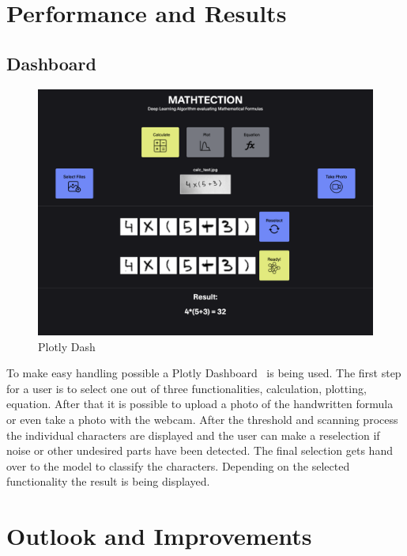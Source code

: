\documentclass[@CLASSOPTIONS@]{tumarticle}
\begin{document}
\section{Performance and Results}
\label{sec:customization}

\subsection{Dashboard}

\begin{figure}
    \begin{minipage}{0.48\textwidth}
     \centering
     \includegraphics[width=.9\linewidth]{figures/dash}
     \caption{Plotly Dash}\label{Fig:Dash}
   \end{minipage}
\end{figure}

To make easy handling possible a Plotly Dashboard~\cite{plotly} is being used.
The first step for a user is to select one out of three functionalities,
calculation, plotting, equation.
After that it is possible to upload a photo of the handwritten formula or even take a photo
with the webcam.
After the threshold and scanning process the individual characters are displayed
and the user can make a reselection if noise or other undesired parts have been detected.
The final selection gets hand over to the model to classify the characters.
Depending on the selected functionality the result is being displayed.

\section{Outlook and Improvements}
\end{document}
